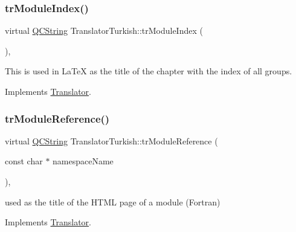 \mbox{\label{class_translator_turkish_a2336fbe0dc7569c9ad6dddf056f1da9e}} 
\subsubsection{\texorpdfstring{trModuleIndex()}{trModuleIndex()}}
{\footnotesize\ttfamily virtual \mbox{\hyperlink{class_q_c_string}{Q\+C\+String}} Translator\+Turkish\+::tr\+Module\+Index (\begin{DoxyParamCaption}{ }\end{DoxyParamCaption})\hspace{0.3cm}{\ttfamily [inline]}, {\ttfamily [virtual]}}

This is used in La\+TeX as the title of the chapter with the index of all groups. 

Implements \mbox{\hyperlink{class_translator}{Translator}}.

\mbox{\label{class_translator_turkish_a2a50eabe59a7de09cb07c12dd952b2bd}} 
\subsubsection{\texorpdfstring{trModuleReference()}{trModuleReference()}}
{\footnotesize\ttfamily virtual \mbox{\hyperlink{class_q_c_string}{Q\+C\+String}} Translator\+Turkish\+::tr\+Module\+Reference (\begin{DoxyParamCaption}\item[{const char $\ast$}]{namespace\+Name }\end{DoxyParamCaption})\hspace{0.3cm}{\ttfamily [inline]}, {\ttfamily [virtual]}}

used as the title of the H\+T\+ML page of a module (Fortran) 

Implements \mbox{\hyperlink{class_translator}{Translator}}.

\mbox{\label{class_translator_turkish_ada46260144c8e230b679a1eda6dc502b}} 
